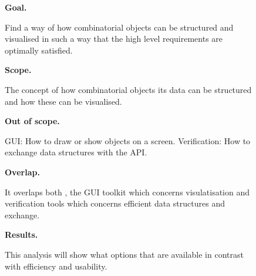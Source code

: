 \begin{figure}[!ht]
{\begin{boxedminipage}[b]{.32\textwidth}
{	    %
	    \par{\bf Goal.}
	    \raggedright Find a way of how combinatorial objects can be structured and
	    visualised in such a way that the high level requirements are
	    optimally satisfied.
	    \par{\bf Scope.}
	    \raggedright The concept of how combinatorial objects its data can be structured
	    and how these can be visualised.
	    \par{\bf Out of scope.}
	    \raggedright GUI: How to draw or show objects on a screen.
	    Verification: How to exchange data structures with the API.
	    \par{\bf Overlap.}
	    \raggedright It overlaps both , the GUI toolkit which concerns visulatisation and
	    verification tools which concerns efficient data structures and exchange.
	    \par{\bf Results.}
	    \raggedright This analysis will show what options that are available in contrast
	    with efficiency and usability.
	}%
    \end{boxedminipage}
    }%
\end{figure}
